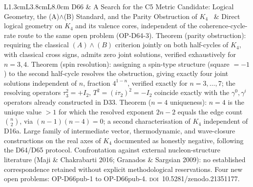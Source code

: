 \documentclass[11pt,a4paper]{article}
\theoremstyle{plain}
\theoremstyle{definition}
\theoremstyle{remark}
\begin{document}
\begin{longtable}{L{1.3cm}L{3.8cm}L{8.0cm}}
D66 & A Search for the C5 Metric Candidate: Logical Geometry, the (A)$\wedge$(B) Standard, and the Parity Obstruction of $K_4$~\cite{D66} & Direct logical geometry on $K_4$ and its valence cores, independent of the coherence-cycle-rate route to the same open problem (OP-D64-3). \textcolor{proofblue}{Theorem} (parity obstruction): requiring the classical $(A)\wedge(B)$ criterion jointly on both half-cycles of $K_4$, with classical cross signs, admits zero joint solutions, verified exhaustively for $n=3,4$. \textcolor{proofblue}{Theorem} (spin resolution): assigning a spin-type structure (square $=-1$) to the second half-cycle resolves the obstruction, giving exactly four joint solutions independent of $n$, fraction $4^{1-n}$, verified exactly for $n=3,\ldots,7$; the resolving operators $\tau_3^2=+I_2$, $T^2=(i\tau_2)^2=-I_2$ coincide exactly with the $\gamma^0,\gamma^i$ operators already constructed in D33. \textcolor{proofblue}{Theorem} ($n=4$ uniqueness): $n=4$ is the unique value $>1$ for which the resolved exponent $2n-2$ equals the edge count $\binom{n}{2}$, via $(n-1)(n-4)=0$; a second characterisation of $K_4$ independent of D16a. Large family of intermediate vector, thermodynamic, and wave-closure constructions on the real axes of $K_4$ documented as honestly negative, following the D64/D65 protocol. Confrontation against external nucleon-structure literature (Maji \& Chakrabarti 2016; Granados \& Sargsian 2009): no established correspondence retained without explicit methodological reservations. Four new open problems: OP-D66pub-1 to OP-D66pub-4. \textsc{doi}~10.5281/zenodo.21351177.\\[0.4em]

\end{longtable}
\end{document}
